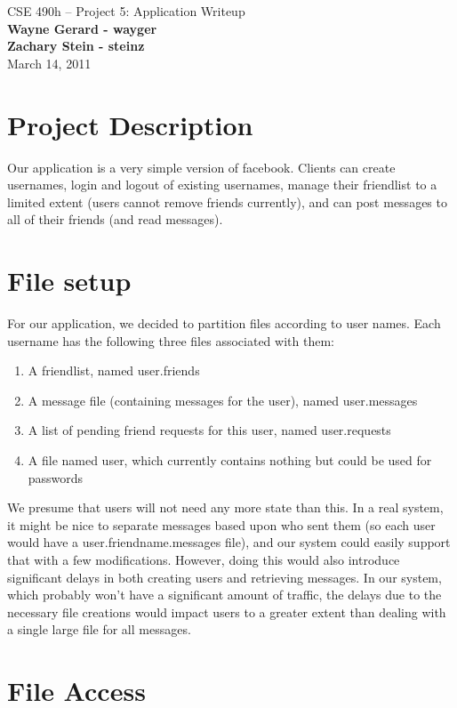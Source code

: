 \documentclass[11pt]{article}
\begin{document}
\begin{center}
{\large CSE 490h -- Project 5: Application Writeup} \\
\textbf{Wayne Gerard - wayger} \\
\textbf{Zachary Stein - steinz} \\
March 14, 2011
\end{center}

\section{Project Description}

Our application is a very simple version of facebook. Clients can create usernames, login and logout of existing usernames, manage their friendlist to a limited extent (users cannot remove friends currently), and can post messages to all of their friends (and read messages).


\section{File setup}

For our application, we decided to partition files according to user names. Each username has the following three files associated with them:

\begin{enumerate}
\item A friendlist, named user.friends
\item A message file (containing messages for the user), named user.messages
\item A list of pending friend requests for this user, named user.requests
\item A file named user, which currently contains nothing but could be used for passwords
\end{enumerate}

We presume that users will not need any more state than this. In a real system, it might be nice to separate messages based upon who sent them (so each user would have a user.friendname.messages file), and our system could easily support that with a few modifications. However, doing this would also introduce significant delays in both creating users and retrieving messages. In our system, which probably won't have a significant amount of traffic, the delays due to the necessary file creations would impact users to a greater extent than dealing with a single large file for all messages.

\section{File Access}
\end{document}
